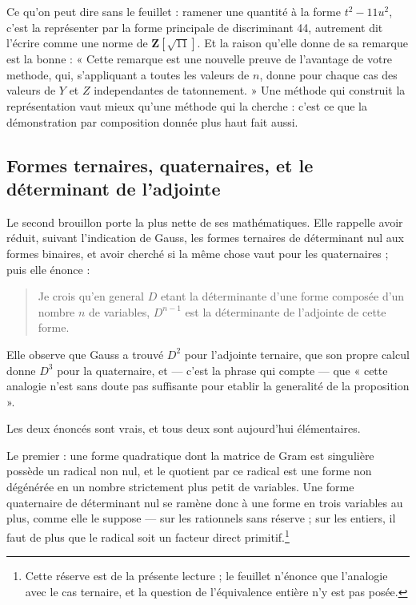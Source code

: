 \documentclass[11pt,a4paper]{article}
\begin{document}
Ce qu'on peut dire sans le feuillet : ramener une quantité à la forme
$t^2 - 11u^2$, c'est la représenter par la forme principale de discriminant
44, autrement dit l'écrire comme une norme de $\mathbf{Z}[\sqrt{11}]$. Et la
raison qu'elle donne de sa remarque est la bonne : « Cette remarque est une
nouvelle preuve de l'avantage de votre methode, qui, s'appliquant a toutes les
valeurs de $n$, donne pour chaque cas des valeurs de $Y$ et $Z$ independantes
de tatonnement. » Une méthode qui construit la représentation vaut mieux
qu'une méthode qui la cherche : c'est ce que la démonstration par composition
donnée plus haut fait aussi.

\subsection*{Formes ternaires, quaternaires, et le déterminant de l'adjointe}

Le second brouillon porte la plus nette de ses mathématiques. Elle rappelle
avoir réduit, suivant l'indication de Gauss, les formes ternaires de
déterminant nul aux formes binaires, et avoir cherché si la même chose vaut
pour les quaternaires ; puis elle énonce :

\begin{quote}
Je crois qu'en general $D$ etant la déterminante d'une forme composée d'un
nombre $n$ de variables, $D^{n-1}$ est la déterminante de l'adjointe de cette
forme.
\end{quote}

Elle observe que Gauss a trouvé $D^2$ pour l'adjointe ternaire, que son propre
calcul donne $D^3$ pour la quaternaire, et — c'est la phrase qui compte —
que « cette analogie n'est sans doute pas suffisante pour etablir la generalité
de la proposition ».

Les deux énoncés sont vrais, et tous deux sont aujourd'hui élémentaires.

Le premier : une forme quadratique dont la matrice de Gram est singulière
possède un radical non nul, et le quotient par ce radical est une forme non
dégénérée en un nombre strictement plus petit de variables. Une forme
quaternaire de déterminant nul se ramène donc à une forme en trois variables
au plus, comme elle le suppose — sur les rationnels sans réserve ; sur les
entiers, il faut de plus que le radical soit un facteur direct
primitif.\footnote{Cette réserve est de la présente lecture ; le feuillet
n'énonce que l'analogie avec le cas ternaire, et la question de l'équivalence
entière n'y est pas posée.}
\end{document}
